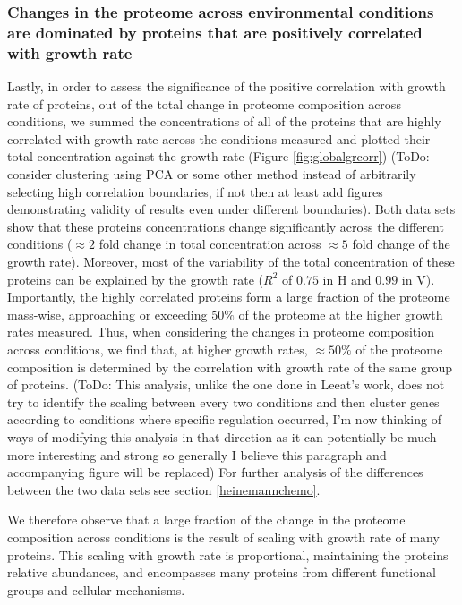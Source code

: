\documentclass[notitlepage]{article}
\begin{document}
\subsubsection{Changes in the proteome across environmental conditions are dominated by proteins that are positively correlated with growth rate}
Lastly, in order to assess the significance of the positive correlation with growth rate of proteins, out of the total change in proteome composition across conditions, we summed the concentrations of all of the proteins that are highly correlated with growth rate across the conditions measured and plotted their total concentration against the growth rate (Figure \ref{fig:globalgrcorr})
(ToDo: consider clustering using PCA or some other method instead of arbitrarily selecting high correlation boundaries, if not then at least add figures demonstrating validity of results even under different boundaries).
Both data sets show that these proteins concentrations change significantly across the different conditions ($\approx 2$ fold change in total concentration across $\approx 5$ fold change of the growth rate).
Moreover, most of the variability of the total concentration of these proteins can be explained by the growth rate ($R^2$ of $0.75$ in H and $0.99$ in V). 
Importantly, the highly correlated proteins form a large fraction of the proteome mass-wise, approaching or exceeding $50\%$ of the proteome at the higher growth rates measured.
Thus, when considering the changes in proteome composition across conditions, we find that, at higher growth rates, $\approx 50\%$ of the proteome composition is determined by the correlation with growth rate of the same group of proteins.
(ToDo: This analysis, unlike the one done in Leeat's work, does not try to identify the scaling between every two conditions and then cluster genes according to conditions where specific regulation occurred, I'm now thinking of ways of modifying this analysis in that direction as it can potentially be much more interesting and strong so generally I believe this paragraph and accompanying figure will be replaced)
For further analysis of the differences between the two data sets see section \ref{heinemannchemo}.

We therefore observe that a large fraction of the change in the proteome composition across conditions is the result of scaling with growth rate of many proteins.
This scaling with growth rate is proportional, maintaining the proteins relative abundances, and encompasses many proteins from different functional groups and cellular mechanisms.
\end{document}
